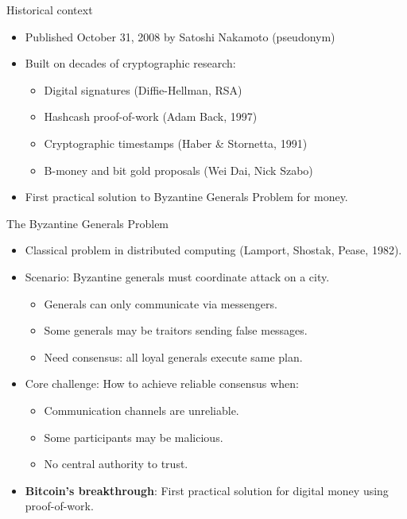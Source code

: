 \documentclass[aspectratio=169, lualatex, handout]{beamer}
\begin{document}
\begin{frame}{Historical context}
	\begin{itemize}
		\item Published October 31, 2008 by Satoshi Nakamoto (pseudonym)
		\item Built on decades of cryptographic research:
		      \begin{itemize}
			      \item Digital signatures (Diffie-Hellman, RSA)
			      \item Hashcash proof-of-work (Adam Back, 1997)
			      \item Cryptographic timestamps (Haber \& Stornetta, 1991)
			      \item B-money and bit gold proposals (Wei Dai, Nick Szabo)
		      \end{itemize}
		\item First practical solution to Byzantine Generals Problem for money.
	\end{itemize}
\end{frame}

\begin{frame}{The Byzantine Generals Problem}
	\begin{itemize}
		\item Classical problem in distributed computing (Lamport, Shostak, Pease, 1982).
		\item Scenario: Byzantine generals must coordinate attack on a city.
		      \begin{itemize}
			      \item Generals can only communicate via messengers.
			      \item Some generals may be traitors sending false messages.
			      \item Need consensus: all loyal generals execute same plan.
		      \end{itemize}
		\item Core challenge: How to achieve reliable consensus when:
		      \begin{itemize}
			      \item Communication channels are unreliable.
			      \item Some participants may be malicious.
			      \item No central authority to trust.
		      \end{itemize}
		\item \textbf{Bitcoin's breakthrough}: First practical solution for digital money using proof-of-work.
	\end{itemize}
\end{frame}
\end{document}

